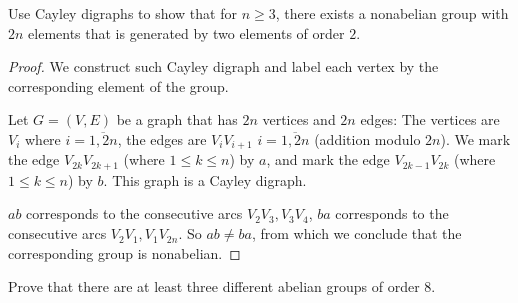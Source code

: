 \newpage
\begin{exercise}
    Use Cayley digraphs to show that for $n \geq 3$, there exists a nonabelian group with $2n$ elements that is generated by two elements of order $2$.
\end{exercise}

\begin{proof}
    We construct such Cayley digraph and label each vertex by the corresponding element of the group.

    Let $G = (V, E)$ be a graph that has $2n$ vertices and $2n$ edges: The vertices are $V_{i}$ where $i = \overline{1,2n}$, the edges are $V_{i}V_{i+1}$ $i = \overline{1,2n}$ (addition modulo $2n$). We mark the edge $V_{2k}V_{2k+1}$ (where $1\le k \le n$) by $a$, and mark the edge $V_{2k-1}V_{2k}$ (where $1\leq k \leq n$) by $b$. This graph is a Cayley digraph.

    $ab$ corresponds to the consecutive arcs $V_{2}V_{3}, V_{3}V_{4}$, $ba$ corresponds to the consecutive arcs $V_{2}V_{1}, V_{1}V_{2n}$. So $ab\ne ba$, from which we conclude that the corresponding group is nonabelian.
\end{proof}

\newpage
\begin{exercise}
    Prove that there are at least three different abelian groups of order 8.
\end{exercise}

